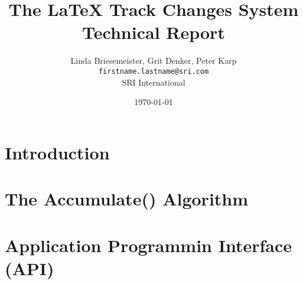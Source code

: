 \documentclass[draft,final]{report}
\title{The \LaTeX{} Track Changes System \\ {\large Technical Report}}
\author{%
Linda Briesemeister, Grit Denker, Peter Karp\\
\texttt{firstname.lastname@sri.com}\\
SRI International
}
\date{\today}
\begin{document}
\maketitle

\dominitoc
\tableofcontents

\chapter{Introduction}




\chapter{The Accumulate() Algorithm}

\chapter{Application Programmin Interface (API)}

%
 


%
\appendix

\end{document}
